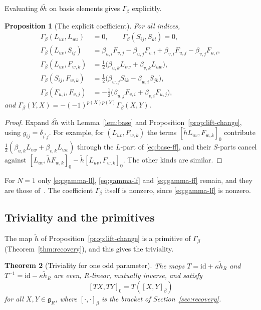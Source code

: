 \documentclass[11pt]{article}
\numberwithin{equation}{section}
\newtheorem{theorem}{Theorem}[section]
\newtheorem{proposition}[theorem]{Proposition}
\theoremstyle{definition}
\theoremstyle{remark}
\begin{document}
Evaluating $\delta\tilde h$ on basis elements gives $\Gamma_\beta$ explicitly.

\begin{proposition}[The explicit coefficient]\label{prop:gamma}
For all indices,
\begin{align}
 \Gamma_\beta(L_{uv},L_{wz})&=0,\qquad \Gamma_\beta(S_{ij},S_{kl})=0,\label{eq:gamma-ll}\\
 \Gamma_\beta(L_{uv},S_{ij})&=\beta_{u,i}F_{v,j}-\beta_{u,j}F_{v,i}
   +\beta_{v,i}F_{u,j}-\beta_{v,j}F_{u,i},\label{eq:gamma-ls}\\
 \Gamma_\beta(L_{uv},F_{w,k})&=\tfrac12\bigl(\beta_{u,k}L_{vw}+\beta_{v,k}L_{uw}\bigr),
   \label{eq:gamma-lf}\\
 \Gamma_\beta(S_{ij},F_{w,k})&=\tfrac12\bigl(\beta_{w,j}S_{ik}-\beta_{w,i}S_{jk}\bigr),
   \label{eq:gamma-sf}\\
 \Gamma_\beta(F_{u,i},F_{v,j})&=-\tfrac12\bigl(\beta_{u,j}F_{v,i}+\beta_{v,i}F_{u,j}\bigr),
   \label{eq:gamma-ff}
\end{align}
and $\Gamma_\beta(Y,X)=-(-1)^{p(X)p(Y)}\Gamma_\beta(X,Y)$.
\end{proposition}

\begin{proof}
Expand $\delta\tilde h$ with Lemma~\ref{lem:base} and
Proposition~\ref{prop:lift-change}, using $g_{ij}=\delta_{i^*j}$. For example, for
$(L_{uv},F_{w,k})$ the terms $[\tilde hL_{uv},F_{w,k}]_0$ contribute
$\tfrac12(\beta_{u,k}L_{vw}+\beta_{v,k}L_{uw})$ through the $L$-part of
\eqref{eq:base-ff}, and their $S$-parts cancel against
$[L_{uv},\tilde hF_{w,k}]_0-\tilde h[L_{uv},F_{w,k}]_0$. The other kinds are similar.
\end{proof}

For $N=1$ only \eqref{eq:gamma-ll}, \eqref{eq:gamma-lf} and \eqref{eq:gamma-ff}
remain, and they are those of~\cite[Proposition~3.1]{Aoi26}. The coefficient $\Gamma_\beta$ itself is
nonzero, since \eqref{eq:gamma-lf} is nonzero.

\subsection{Triviality and the primitives}\label{sec:triviality}

The map $\tilde h$ of Proposition~\ref{prop:lift-change} is a primitive of $\Gamma_\beta$
(Theorem~\ref{thm:recovery}), and this gives the triviality.

\begin{theorem}[Triviality for one odd parameter]\label{thm:triv-single}
The maps $T=\mathrm{id}+\kappa\tilde h_R$ and $T^{-1}=\mathrm{id}-\kappa\tilde h_R$ are even,
$R$-linear, mutually inverse, and satisfy
\[
 [TX,TY]_0=T([X,Y]_\beta)
\]
for all $X,Y\in\mathfrak g_R$, where $[\cdot,\cdot]_\beta$ is the bracket of Section~\ref{sec:recovery}.
\end{theorem}
\end{document}
